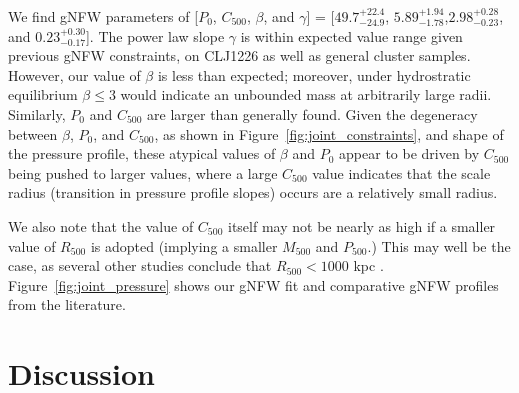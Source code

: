 \documentclass[twocolumn,traditabstract]{aa}
\begin{document}

We find gNFW parameters of [$P_0$, $C_{500}$, $\beta$, and $\gamma$] =
[$49.7_{-24.9}^{+22.4}$, $5.89_{-1.78}^{+1.94}$,$2.98_{-0.23}^{+0.28}$, and $0.23_{-0.17}^{+0.30}$].
The power law slope $\gamma$ is within expected value range given previous gNFW constraints,
on CLJ1226 as well as general cluster samples. However, our value of $\beta$ is less than expected;
moreover, under hydrostratic equilibrium $\beta \le 3$ would indicate an unbounded mass at arbitrarily
large radii. Similarly, $P_0$ and $C_{500}$ are larger than generally found.
Given the degeneracy between $\beta$, $P_0$, and $C_{500}$, as shown in Figure~\ref{fig:joint_constraints},
and shape of the pressure profile, these atypical
values of $\beta$ and  $P_0$ appear to be driven by $C_{500}$ being pushed to larger values, where a large $C_{500}$
value indicates that the scale radius (transition in pressure profile slopes) occurs are a relatively small radius.

We also note that the value of $C_{500}$ itself may not be nearly as high if a smaller value of $R_{500}$
is adopted (implying a smaller $M_{500}$ and $P_{500}$.) This may well be the case, as several other
studies conclude that $R_{500} < 1000$ kpc \citep[e.g][]{rumsey2016,mroczkowski2009}.
Figure~\ref{fig:joint_pressure} shows our gNFW fit and comparative gNFW profiles from the literature.

\section{Discussion}
\label{sec:discussion}
\end{document}
